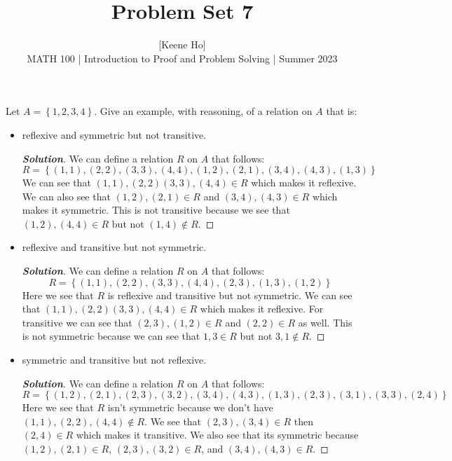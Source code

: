 \documentclass[11pt]{article}
\newenvironment{problem}[2][Problem\!]{\begin{trivlist}
\item[\hskip \labelsep {\bfseries #1}\hskip \labelsep {\bfseries #2.}]}{\end{trivlist}}
\newenvironment{solution}{\begin{proof}[\textbf{\textit{Solution}}]}{\end{proof}}
\newcommand{\set}[1]{\left\{#1\right\}} %
\begin{document}
 
\title{Problem Set 7}
\author{[Keene Ho]\\[0.5em]
MATH 100 | Introduction to Proof and Problem Solving | Summer 2023}
\date{} 
\maketitle


\begin{problem}{7.1}
Let $A = \set{1, 2, 3, 4}$. Give an example, with reasoning, of a relation on $A$ that is:
\begin{itemize}[itemsep=2em]
\item[(a)] reflexive and symmetric but not transitive.
\begin{solution}
We can define a relation \(R\) on \(A\) that follows:\\
\[R = \set{(1, 1), (2, 2), (3, 3), (4, 4), (1, 2), (2, 1), (3, 4), (4, 3), (1, 3)}\]
We can see that \((1,1),(2,2)(3,3),(4,4) \in R\) which makes it reflexive. We can also see that \((1,2),(2,1) \in R\) and \((3,4),(4,3) \in R\) which makes it symmetric. This is not transitive because we see that \((1,2),(4,4) \in R\) but not \((1,4) \notin R\).

\end{solution}

\item[(b)] reflexive and transitive but not symmetric.
\begin{solution}
We can define a relation \(R\) on \(A\) that follows:
\[R = \set{(1,1),(2,2),(3,3),(4,4),(2,3),(1,3),(1,2)}\]
Here we see that \(R\) is reflexive and transitive but not symmetric. We can see that \((1,1),(2,2)(3,3),(4,4) \in R\) which makes it reflexive. For transitive we can see that \((2,3),(1,2) \in R\)
and \((2,2) \in R\) as well. This is not symmetric because we can see that \(1,3 \in R\) but not \(3,1 \notin R\).
\end{solution}

\item[(c)] symmetric and transitive but not reflexive.
\begin{solution}
We can define a relation \(R\) on \(A\) that follows:
\[R = \set{(1,2),(2,1),(2,3),(3,2),(3,4),(4,3),(1,3),(2,3),(3,1),(3,3),(2,4)}\]
Here we see that \(R\) isn't symmetric because we don't have \((1,1),(2,2),(4,4) \notin R\). We see that \((2,3),(3,4) \in R\) then \((2,4) \in R\) which makes it transitive. We also see that its symmetric because \((1,2),(2,1) \in R\), \((2,3),(3,2) \in R\), and \((3,4),(4,3) \in R\).
\end{solution}


\end{itemize}
\end{problem}
\end{document}
